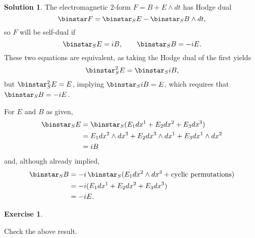 \documentclass[11pt, a4paper]{report}
\theoremstyle{definition}
\newtheorem{exercise}{Exercise}[part]
\newtheorem{solution}{Solution}[part]
\newenvironment{ex}{\begin{exercise}}{\end{exercise}\pagebreak[1]}
\newenvironment{sol}{\begin{solution}}{\end{solution}\pagebreak[3]}
\newcommand*{\op}[1]{\ensuremath\mathop{}\mathopen{}#1}
\renewcommand*{\star}{\op{\binstar}\mathord{}}
\begin{document}
\begin{sol}

The electromagnetic 2-form $F = B + E \wedge dt$ has Hodge dual
\[
    \star F = \star_S E - \star_S B \wedge dt,
\]
so $F$ will be self-dual if
\[
    \star_S E = iB, \qquad \star_S B = -iE.
\]
These two equations are equivalent, as taking the Hodge dual of the first yields
\[
    \star_S^2 E = \star_S iB,
\]
but $\star_S^2 E = E$, implying $\star_S iB = E$, which requires that $\star_S B = -iE$.

For $E$ and $B$ as given,
\begin{align*}
    \star_S E &= \star_S (E_1 dx^1 + E_2 dx^2 + E_3 dx^3) \\
        &= E_1 dx^2 \wedge dx^3 + E_2 dx^3 \wedge dx^1 + E_3 dx^1 \wedge dx^2 \\
        &= iB
\end{align*}
and, although already implied,
\begin{align*}
    \star_S B &= -i \star_S (E_1 dx^2 \wedge dx^3 + \text{cyclic permutations}) \\
              &= -i (E_1 dx^1 + E_2 dx^2 + E_3 dx^3) \\
              &= -iE.
\end{align*}

\end{sol}

\begin{ex}\label{ex:planewavemaxwelleq2}

Check the above result.

\end{ex}
\end{document}
